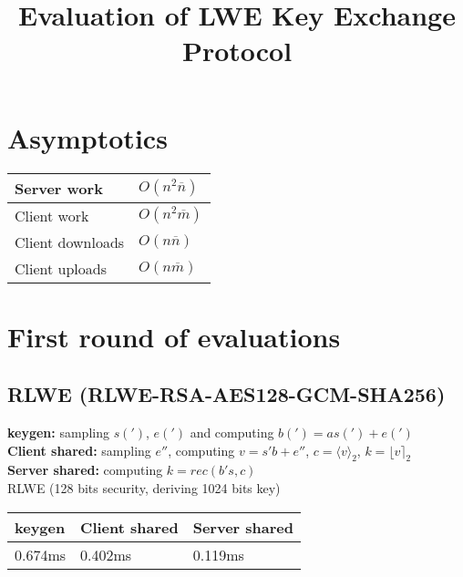 \documentclass[12pt]{article}
\newcommand{\nbar}{\overline{n}}
\newcommand{\mbar}{\overline{m}}
\begin{document}
\title{Evaluation of LWE Key Exchange Protocol}
\maketitle

\section{Asymptotics}
\begin{center}
    \begin{tabular}{| l | l |}
    \hline
Server work & $O(n^2\nbar)$\\ \hline
Client work & $O(n^2\mbar)$\\ \hline
Client downloads & $O(n \nbar)$\\ \hline
Client uploads & $O(n \mbar)$\\ \hline
    \end{tabular}
\end{center}

\section{First round of evaluations}
\subsection{RLWE \tiny{(RLWE-RSA-AES128-GCM-SHA256)}}

\footnotesize{\textbf{keygen:} sampling $s(')$, $e(')$ and computing $b(') = as(') + e(')$\\
\textbf{Client shared:} sampling $e''$, computing $v = s'b + e''$, $c = \langle v \rangle_2$, $k = \lfloor v \rceil_2$\\
\textbf{Server shared:} computing $k = rec(b's, c)$}\\

RLWE (128 bits security, deriving 1024 bits key)
\begin{center}
    \begin{tabular}{| l | l | l |}
    \hline
    keygen & Client shared & Server shared \\ \hline
    0.674ms & 0.402ms & 0.119ms  \\ \hline
    \end{tabular}
\end{center}
\end{document}
